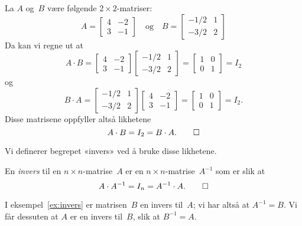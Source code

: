 \begin{ex}
\label{ex:invers}
La $A$ og~$B$ være følgende $2 \times 2$-matriser:
\[
A =
\begin{bmatrix}
 4 & -2 \\
 3 & -1
\end{bmatrix}
\quad\text{og}\quad
B =
\begin{bmatrix}
-1/2 & 1 \\
-3/2 & 2
\end{bmatrix}
\]
Da kan vi regne ut at
\[
A \cdot B
= 
\begin{bmatrix}
 4 & -2 \\
 3 & -1
\end{bmatrix}
\begin{bmatrix}
-1/2 & 1 \\
-3/2 & 2
\end{bmatrix}
=
\begin{bmatrix}
1 & 0 \\
0 & 1
\end{bmatrix}
= I_2
\]
og
\[
B \cdot A
= 
\begin{bmatrix}
-1/2 & 1 \\
-3/2 & 2
\end{bmatrix}
\begin{bmatrix}
 4 & -2 \\
 3 & -1
\end{bmatrix}
=
\begin{bmatrix}
1 & 0 \\
0 & 1
\end{bmatrix}
= I_2.
\]
Disse matrisene oppfyller altså likhetene
\[
A \cdot B = I_2 = B \cdot A.\qedhere
\]
\end{ex}

Vi definerer begrepet «invers» ved å bruke disse likhetene.

\begin{defn}
En \emph{invers} til en $n \times n$-matrise~$A$ er en
$n \times n$-matrise~$A^{-1}$ som er slik at
\[
A \cdot A^{-1} = I_n = A^{-1} \cdot A.\qedhere
\]
\end{defn}

\begin{ex}
I eksempel~\ref{ex:invers} er matrisen~$B$ en invers til~$A$; vi har
altså at $A^{-1} = B$.  Vi får dessuten at $A$ er en invers til~$B$,
slik at $B^{-1} = A$.
\end{ex}





